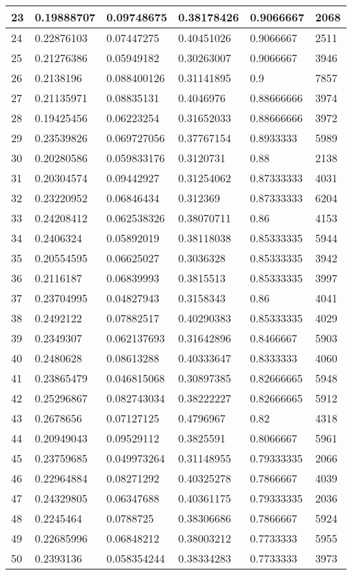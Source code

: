 \begin{longtable}{|l|l|l|l|l|l|}
23 & 0.19888707 & 0.09748675 & 0.38178426 & 0.9066667 & 2068 \\ \hline 
24 & 0.22876103 & 0.07447275 & 0.40451026 & 0.9066667 & 2511 \\ \hline 
25 & 0.21276386 & 0.05949182 & 0.30263007 & 0.9066667 & 3946 \\ \hline 
26 & 0.2138196 & 0.088400126 & 0.31141895 & 0.9 & 7857 \\ \hline 
27 & 0.21135971 & 0.08835131 & 0.4046976 & 0.88666666 & 3974 \\ \hline 
28 & 0.19425456 & 0.06223254 & 0.31652033 & 0.88666666 & 3972 \\ \hline 
29 & 0.23539826 & 0.069727056 & 0.37767154 & 0.8933333 & 5989 \\ \hline 
30 & 0.20280586 & 0.059833176 & 0.3120731 & 0.88 & 2138 \\ \hline 
31 & 0.20304574 & 0.09442927 & 0.31254062 & 0.87333333 & 4031 \\ \hline 
32 & 0.23220952 & 0.06846434 & 0.312369 & 0.87333333 & 6204 \\ \hline 
33 & 0.24208412 & 0.062538326 & 0.38070711 & 0.86 & 4153 \\ \hline 
34 & 0.2406324 & 0.05892019 & 0.38118038 & 0.85333335 & 5944 \\ \hline 
35 & 0.20554595 & 0.06625027 & 0.3036328 & 0.85333335 & 3942 \\ \hline 
36 & 0.2116187 & 0.06839993 & 0.3815513 & 0.85333335 & 3997 \\ \hline 
37 & 0.23704995 & 0.04827943 & 0.3158343 & 0.86 & 4041 \\ \hline 
38 & 0.2492122 & 0.07882517 & 0.40290383 & 0.85333335 & 4029 \\ \hline 
39 & 0.2349307 & 0.062137693 & 0.31642896 & 0.8466667 & 5903 \\ \hline 
40 & 0.2480628 & 0.08613288 & 0.40333647 & 0.8333333 & 4060 \\ \hline 
41 & 0.23865479 & 0.046815068 & 0.30897385 & 0.82666665 & 5948 \\ \hline 
42 & 0.25296867 & 0.082743034 & 0.38222227 & 0.82666665 & 5912 \\ \hline 
43 & 0.2678656 & 0.07127125 & 0.4796967 & 0.82 & 4318 \\ \hline 
44 & 0.20949043 & 0.09529112 & 0.3825591 & 0.8066667 & 5961 \\ \hline 
45 & 0.23759685 & 0.049973264 & 0.31148955 & 0.79333335 & 2066 \\ \hline 
46 & 0.22964884 & 0.08271292 & 0.40325278 & 0.7866667 & 4039 \\ \hline 
47 & 0.24329805 & 0.06347688 & 0.40361175 & 0.79333335 & 2036 \\ \hline 
48 & 0.2245464 & 0.0788725 & 0.38306686 & 0.7866667 & 5924 \\ \hline 
49 & 0.22685996 & 0.06848212 & 0.38003212 & 0.7733333 & 5955 \\ \hline 
50 & 0.2393136 & 0.058354244 & 0.38334283 & 0.7733333 & 3973 \\ \hline 
\end{longtable}